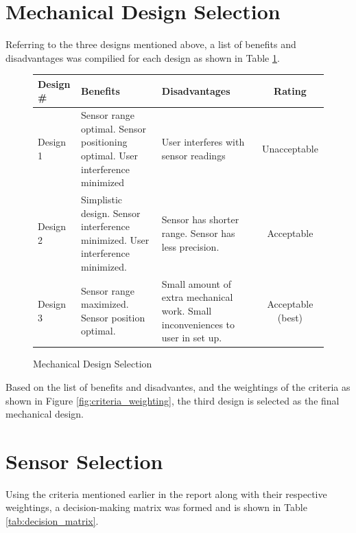 \documentclass[oneside,final,a4paper]{report}
\begin{document}
\section{Mechanical Design Selection} \label{MechDesSel}
Referring to the three designs mentioned above, a list of benefits and disadvantages was compilied for each design as shown in Table \ref{tab:MechDesSel}.

\begin{figure}[ht]
\centering
\begin{tabular}{|l|p{5cm}|p{5cm}|c|}
\hline
Design \# & Benefits & Disadvantages & Rating\\
\hline \hline
Design 1 &Sensor range optimal. Sensor positioning optimal. User interference minimized & User interferes with sensor readings& Unacceptable\\
\hline
Design 2 & Simplistic design. Sensor interference minimized. User interference minimized. & Sensor has shorter range. Sensor has less precision. & Acceptable\\
\hline
Design 3 & Sensor range maximized. Sensor position optimal.&Small amount of extra mechanical work. Small inconveniences to user in set up. & Acceptable (best)\\
\hline
\end{tabular}
\caption{Mechanical Design Selection}
\label{tab:MechDesSel}
\end{figure}

Based on the list of benefits and disadvantes, and the weightings of the criteria as shown in Figure \ref{fig:criteria_weighting}, the third design is selected as the final mechanical design.

\section{Sensor Selection}

Using the criteria mentioned earlier in the report along with their respective weightings, a decision-making matrix was formed and is shown in Table \ref{tab:decision_matrix}.
\end{document}
